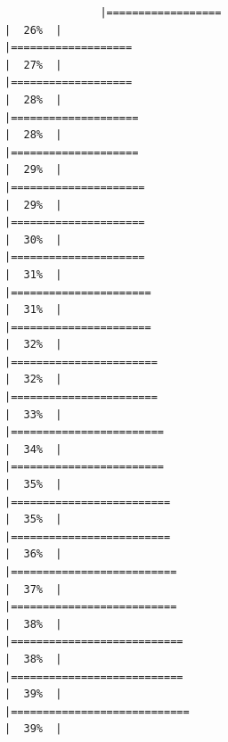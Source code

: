 \documentclass[
]{article}
\begin{document}
\begin{verbatim}
               |==================                                                    |  26%  |                                                                              |===================                                                   |  27%  |                                                                              |===================                                                   |  28%  |                                                                              |====================                                                  |  28%  |                                                                              |====================                                                  |  29%  |                                                                              |=====================                                                 |  29%  |                                                                              |=====================                                                 |  30%  |                                                                              |=====================                                                 |  31%  |                                                                              |======================                                                |  31%  |                                                                              |======================                                                |  32%  |                                                                              |=======================                                               |  32%  |                                                                              |=======================                                               |  33%  |                                                                              |========================                                              |  34%  |                                                                              |========================                                              |  35%  |                                                                              |=========================                                             |  35%  |                                                                              |=========================                                             |  36%  |                                                                              |==========================                                            |  37%  |                                                                              |==========================                                            |  38%  |                                                                              |===========================                                           |  38%  |                                                                              |===========================                                           |  39%  |                                                                              |============================                                          |  39%  |                                                                
\end{verbatim}
\end{document}
